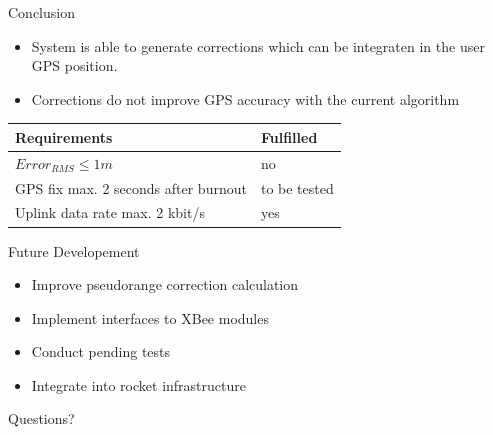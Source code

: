 \documentclass[12pt, compress, xcolor=table]{beamer}
\begin{document}
\begin{frame}{Conclusion}
  \begin{itemize}
    \setlength\itemsep{0.5cm}
    \item System is able to generate corrections which can be integraten in the user GPS position.
    \item Corrections do not improve GPS accuracy with the current algorithm
  \end{itemize}
  
  \begin{table}[]
    \begin{tabular}{l|l}
      Requirements                         & Fulfilled    \\ \hline
      $Error_{RMS} \le 1m$                 & no           \\
      GPS fix max. 2 seconds after burnout & to be tested \\
      Uplink data rate max. 2 kbit/s       & yes         
    \end{tabular}
  \end{table}
\end{frame}

\begin{frame}{Future Developement}
   \begin{itemize}
   \setlength\itemsep{0.5cm}
   \item Improve pseudorange correction calculation
   \item Implement interfaces to XBee modules
   \item Conduct pending tests
   \item Integrate into rocket infrastructure
  \end{itemize}
\end{frame}


\begin{frame}[standout]
 Questions?
\end{frame}
\end{document}
